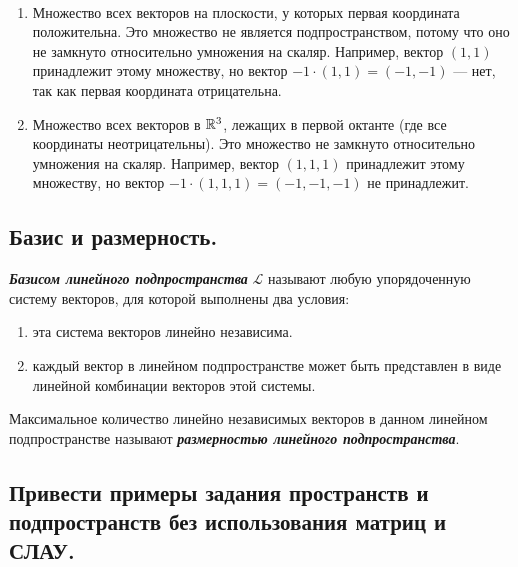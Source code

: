 \begin{counterexample}~

    \begin{enumerate}
        \item Множество всех векторов на плоскости, у которых первая координата положительна. Это множество не является подпространством, потому что оно не замкнуто относительно умножения на скаляр. Например, вектор $(1, 1)$ принадлежит этому множеству, но вектор $-1 \cdot (1, 1) = (-1, -1)$ — нет, так как первая координата отрицательна.
        \item Множество всех векторов в $\mathbb{R}^3$, лежащих в первой октанте (где все координаты неотрицательны). Это множество не замкнуто относительно умножения на скаляр. Например, вектор $(1, 1, 1)$ принадлежит этому множеству, но вектор $-1 \cdot (1, 1, 1) = (-1, -1, -1)$ не принадлежит.
    \end{enumerate}
\end{counterexample}


\newpage


\subsection{
    Базис и размерность.
}

\begin{definition}
    \textbf{\textit{Базисом линейного подпространства}} $\mathcal{L}$ называют любую упорядоченную систему векторов, для которой выполнены два условия:
    \begin{enumerate}[nosep]
        \item эта система векторов линейно независима.
        \item каждый вектор в линейном подпространстве может быть представлен в виде линейной комбинации векторов этой системы.
    \end{enumerate}
\end{definition}

\begin{definition}
    Максимальное количество линейно независимых векторов в данном линейном подпространстве называют \textbf{\textit{размерностью линейного подпространства}}.
\end{definition}


\newpage


\subsection{
    Привести примеры задания пространств и подпространств без использования матриц и СЛАУ.
}

